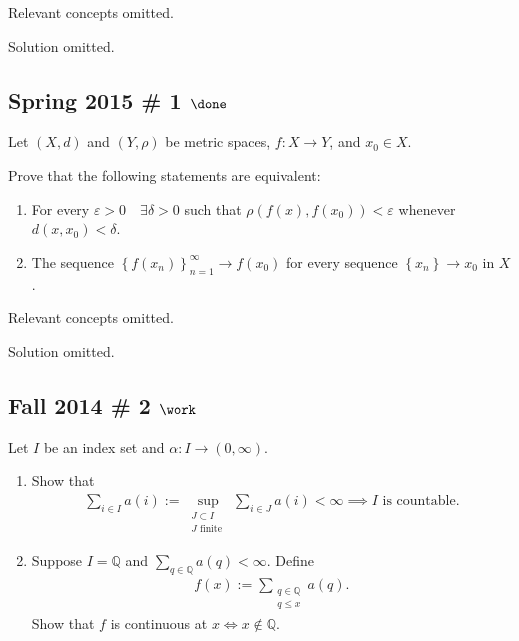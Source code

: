 Relevant concepts omitted.

Solution omitted.

\hypertarget{spring-2015-1-done}{%
\subsection{\texorpdfstring{Spring 2015 \# 1
\(\done\)}{Spring 2015 \# 1 \textbackslash done}}\label{spring-2015-1-done}}

Let \((X, d)\) and \((Y, \rho)\) be metric spaces, \(f: X\to Y\), and
\(x_0 \in X\).

Prove that the following statements are equivalent:

\begin{enumerate}
\def\labelenumi{\arabic{enumi}.}
\tightlist
\item
  For every \(\varepsilon > 0 \quad \exists \delta > 0\) such that
  \(\rho( f(x), f(x_0) ) < \varepsilon\) whenever
  \(d(x, x_0) < \delta\).
\item
  The sequence \(\left\{{f(x_n)}\right\}_{n=1}^\infty \to f(x_0)\) for
  every sequence \(\left\{{x_n}\right\} \to x_0\) in \(X\).
\end{enumerate}

Relevant concepts omitted.

Solution omitted.

\hypertarget{fall-2014-2-work}{%
\subsection{\texorpdfstring{Fall 2014 \# 2
\(\work\)}{Fall 2014 \# 2 \textbackslash work}}\label{fall-2014-2-work}}

Let \(I\) be an index set and \(\alpha: I \to (0, \infty)\).

\begin{enumerate}
\def\labelenumi{\alph{enumi}.}
\item
  Show that
  \begin{align*}
  \sum_{i \in I} a(i):=\sup _{\substack{ J \subset I \\ J \text { finite }}} \sum_{i \in J} a(i)<\infty \implies I \text{ is countable.}
  \end{align*}
\item
  Suppose \(I = {\mathbb{Q}}\) and
  \(\sum_{q \in \mathbb{Q}} a(q)<\infty\). Define
  \begin{align*}
  f(x):=\sum_{\substack{q \in \mathbb{Q}\\ q \leq x}} a(q).
  \end{align*}
  Show that \(f\) is continuous at \(x \iff x\not\in {\mathbb{Q}}\).
\end{enumerate}

